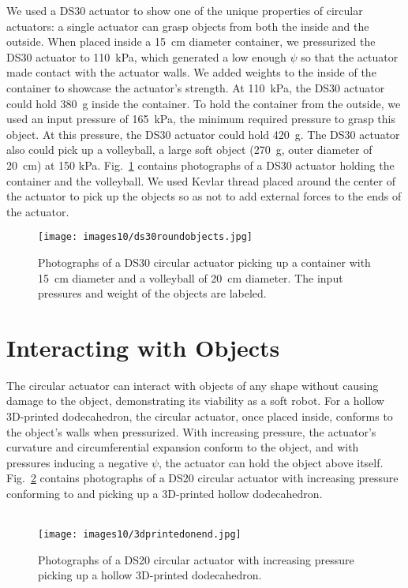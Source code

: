 We used a DS30 actuator to show one of the unique properties of circular actuators: a single actuator can grasp objects from both the inside and the outside. When placed inside a 15~cm diameter container, we pressurized the DS30 actuator to 110~kPa, which generated a low enough $\psi$ so that the actuator made contact with the actuator walls. We added weights to the inside of the container to showcase the actuator's strength. At 110~kPa, the DS30 actuator could hold 380~g inside the container. To hold the container from the outside, we used an input pressure of 165~kPa, the minimum required pressure to grasp this object. At this pressure, the DS30 actuator could hold 420~g. The DS30 actuator also could pick up a volleyball, a large soft object (270~g, outer diameter of 20~cm) at 150 kPa. Fig.~\ref{fig:ds30roundobjects} contains photographs of a DS30 actuator holding the container and the volleyball. We used Kevlar thread placed around the center of the actuator to pick up the objects so as not to add external forces to the ends of the actuator. 
\\
\begin{figure}[!ht]
    \centering
     \texttt{[image: images10/ds30roundobjects.jpg]}
    \caption{Photographs of a DS30 circular actuator picking up a container with 15~cm diameter and a volleyball of 20~cm diameter. The input pressures and weight of the objects are labeled.}
    \label{fig:ds30roundobjects}
\end{figure}

\clearpage
\section{Interacting with Objects}

The circular actuator can interact with objects of any shape without causing damage to the object, demonstrating its viability as a soft robot. For a hollow 3D-printed dodecahedron, the circular actuator, once placed inside, conforms to the object's walls when pressurized. With increasing pressure, the actuator's curvature and circumferential expansion conform to the object, and with pressures inducing a negative $\psi$, the actuator can hold the object above itself. Fig.~\ref{fig:3dprintedonend} contains photographs of a DS20 circular actuator with increasing pressure conforming to and picking up a 3D-printed hollow dodecahedron. \\ \\

\begin{figure}[!ht]
    \centering
    \texttt{[image: images10/3dprintedonend.jpg]}
    \caption{Photographs of a DS20 circular actuator with increasing pressure picking up a hollow 3D-printed dodecahedron.}
    \label{fig:3dprintedonend}
\end{figure}

